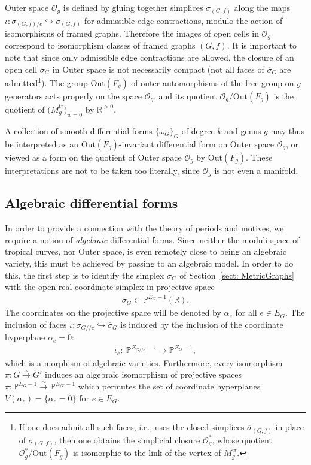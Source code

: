 \documentclass[pdftex]{sigma}%
\numberwithin{equation}{section}
\newcommand{\To}{\longrightarrow}
\newcommand{\R}{\mathbb R}
\newcommand{\Pro}{\mathbb P}
\newcommand{\q}{/\!/}
\newcommand{\0}{\color{blue}{\mathsf{0}}}
\begin{document}
 Outer space $\mathcal{O}_g$ is defined \cite{CullerVogtmann} by gluing together simplices $\sigma_{(G,f)}$ along the maps $\iota\colon \sigma_{(G,f)/e} \hookrightarrow \overline{\sigma}_{(G,f)}$ for admissible edge contractions, modulo the action of isomorphisms of framed graphs.
 Therefore the images of open cells in $\mathcal{O}_g$ correspond to isomorphism classes of framed graphs $(G,f)$.
 It is important to note that since only admissible edge contractions are allowed, the closure of an open cell $\sigma_G$ in Outer space is not necessarily compact (not all faces of $\overline{\sigma}_G$ are admitted\footnote{If one does admit all such faces, i.e., uses the closed simplices $\overline{\sigma}_{(G,f)}$ in place of $\sigma_{(G,f)}$, then one obtains the simplicial closure $\mathcal{O}^*_g$, whose quotient $\mathcal{O}^*_g/\mathrm{Out}(F_g)$ is isomorphic to the link of the vertex of $M^{\mathrm{tr}}_{g}$.}).
The group $\mathrm{Out}(F_g)$ of outer automorphisms of the free group on $g$ generators acts properly on the space $\mathcal{O}_g$, and its quotient $\mathcal{O}_g / \mathrm{Out}(F_g)$ is the quotient of $\big(M_g^\mathrm{tr}\big)_{w=0}$ by $\R^{>0}$.

 A collection of smooth differential forms $\{\omega_G\}_G$ of degree $k$ and genus $g$
 may thus be interpreted as an $\mathrm{Out}(F_g)$-invariant differential form on Outer space $\mathcal{O}_g$, or viewed as a form on the quotient of Outer space $\mathcal{O}_g$ by $\mathrm{Out}(F_g)$. These interpretations are not to be taken too literally, since $\mathcal{O}_g$ is not even a manifold.

\subsection{Algebraic differential forms}
In order to provide a connection with the theory of periods and motives, we require a notion of \emph{algebraic} differential forms.
Since neither the moduli space of tropical curves, nor Outer space, is even remotely close to being an algebraic variety, this must be achieved by passing to an algebraic model. In order to do this,
 the first step is to identify the simplex $\sigma_G$ of Section~\ref{sect: MetricGraphs} with the open real coordinate simplex in projective space
 \begin{gather*}
 \sigma_G \subset \Pro^{E_G-1} (\R).
 \end{gather*}
 The coordinates on the projective space will be denoted by $\alpha_e$ for all $e \in E_G$.
 The inclusion of faces $\iota\colon \sigma_{G/ \!/ e} \hookrightarrow \overline{\sigma}_G$ is induced by the inclusion of the coordinate hyperplane $\alpha_e=0$:
 \begin{gather} \label{iotae}
 \iota_e \colon \ \Pro^{E_{G\q e}-1} \To \Pro^{E_G-1},
 \end{gather}
 which is a morphism of algebraic varieties.
 Furthermore, every isomorphism $\pi\colon G \overset{\sim}{\rightarrow} G'$ induces an algebraic isomorphism of projective spaces
 $\pi\colon \Pro^{E_{G}-1} \overset{\sim}{\rightarrow} \Pro^{E_{G'}-1} $ which permutes the set of coordinate hyperplanes $V(\alpha_e)= \{\alpha_e=0\}$ for $e\in E_G$.
\end{document}
